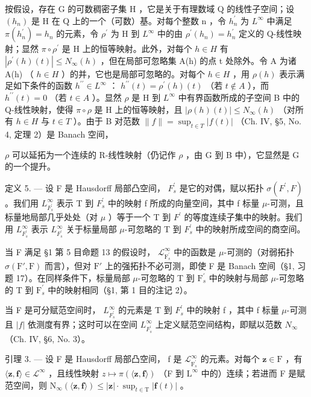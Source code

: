 按假设，存在 G 的可数稠密子集 H ，它是关于有理数域 Q 的线性子空间；设 \((h_{n})\) 是 H 在 Q 上的一个（可数）基。对每个整数 n ，令 \(h_{n}^{\prime}\) 为 \(L^{\infty}\) 中满足 \(\pi(h_{n}^{\prime}) = h_{n}\) 的元素，令 \(\rho^{\prime}\) 为 H 到 \(L^{\infty}\) 中的由 \(\rho^{\prime}(h_{n}) = h_{n}^{\prime}\) 定义的 Q-线性映射；显然 \(\pi \circ \rho^{\prime}\) 是 H 上的恒等映射。此外，对每个 \(h \in H\) 有 \(|\rho^{\prime}(h)(t)| \leqslant N_{\infty}(h)\) ，但在局部可忽略集 A(h) 的点 t 处除外。令 A 为诸 A(h) （ \(h \in H\) ）的并，它也是局部可忽略的。对每个 \(h \in H\) ，用 \(\rho(h)\) 表示满足如下条件的函数 \(h^{\prime\prime} \in L^{\infty}\) ： \(h^{\prime\prime}(t) = \rho^{\prime}(h)(t)\) （若 \(t \notin A\) ），而 \(h^{\prime\prime}(t) = 0\) （若 \(t \in A\) ）。显然 \(\rho\) 是 H 到 \(L^{\infty}\) 中有界函数所成的子空间 B 中的 Q-线性映射，使得 \(\pi \circ \rho\) 是 H 上的恒等映射，且 \(|\rho(h)(t)| \leqslant N_{\infty}(h)\) （对所有 \(h \in H\) 与 \(t \in T\) ）。由于 B 对范数 \(\|f\| = \sup_{t \in T} |f(t)|\) （Ch. IV, §5, No. 4, 定理 2）是 Banach 空间，

\(\rho\) 可以延拓为一个连续的 R-线性映射（仍记作 \(\rho\) ，由 G 到 B 中），它显然是 G 的一个提升。

定义 5. --- 设 F 是 Hausdorff 局部凸空间， \(F_{s}^{\prime}\) 是它的对偶，赋以拓扑 \(\sigma(F^{\prime},F)\) 。我们用 \(L_{F_{s}^{\prime}}^{\infty}\) 表示 T 到 \(F_{s}^{\prime}\) 中的映射 f 所成的向量空间，其中 f 标量 \(\mu\)-可测，且标量地局部几乎处处（对 \(\mu\) ）等于一个 T 到 \(F^{\prime}\) 的等度连续子集中的映射。我们用 \(L_{F_{s}^{\prime}}^{\infty}\) 表示 \(L_{F_{s}^{\prime}}^{\infty}\) 关于标量局部 \(\mu\)-可忽略的 T 到 \(F_{s}^{\prime}\) 中的映射所成空间的商空间。

当 F 满足 §1 第 5 目命题 13 的假设时， \(\mathcal{L}_{\mathrm{F}_s^\prime}^\infty\) 中的函数是 \(\mu\)-可测的（对弱拓扑 \(\sigma(\mathrm{F}',\mathrm{F})\) 而言），但对 \(\mathrm{F}'\) 上的强拓扑不必可测，即使 F 是 Banach 空间（§1, 习题 17）。在同样条件下，标量局部 \(\mu\)-可忽略的 T 到 \(\mathrm{F}_s^\prime\) 中的映射与局部 \(\mu\)-可忽略的 T 到 \(\mathrm{F}_s^\prime\) 中的映射相同（§1, 第 1 目的注记 2）。

当 F 是可分赋范空间时， \(L_{F_{s}^{\prime}}^{\infty}\) 的元素是 T 到 \(F_{s}^{\prime}\) 中的映射 f ，其中 f 标量 \(\mu\)-可测且 \(|f|\) 依测度有界；这时可以在空间 \(L_{F_{s}^{\prime}}^{\infty}\) 上定义赋范空间结构，即赋以范数 \(N_{\infty}\) （Ch. IV, §6, No. 3）。

引理 3. --- 设 F 是 Hausdorff 局部凸空间， f 是 \(\mathcal{L}_{\mathrm{F}_s^\prime}^\infty\) 的元素。对每个 \(\mathbf{z} \in \mathrm{F}\) ，有 \(\langle \mathbf{z}, \mathbf{f} \rangle \in \mathcal{L}^\infty\) ，且线性映射 \(z \mapsto \pi(\langle \mathbf{z}, \mathbf{f} \rangle)\) （F 到 \(\mathrm{L}^\infty\) 中的）连续；若进而 F 是赋范空间，则 \(\mathrm{N}_\infty(\langle \mathbf{z}, \mathbf{f} \rangle) \leqslant |\mathbf{z}| \cdot \sup_{t \in \mathrm{T}} |\mathbf{f}(t)|\) 。

